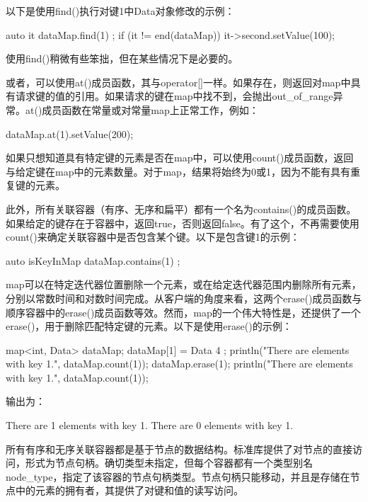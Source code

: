以下是使用find()执行对键1中Data对象修改的示例：

\begin{cpp}
auto it { dataMap.find(1) };
if (it != end(dataMap)) {
    it->second.setValue(100);
}
\end{cpp}

使用find()稍微有些笨拙，但在某些情况下是必要的。

或者，可以使用at()成员函数，其与operator[]一样。如果存在，则返回对map中具有请求键的值的引用。如果请求的键在map中找不到，会抛出out\_of\_range异常。at()成员函数在常量或对常量map上正常工作，例如：

\begin{cpp}
dataMap.at(1).setValue(200);
\end{cpp}

如果只想知道具有特定键的元素是否在map中，可以使用count()成员函数，返回与给定键在map中的元素数量。对于map，结果将始终为0或1，因为不能有具有重复键的元素。

此外，所有关联容器（有序、无序和扁平）都有一个名为contains()的成员函数。如果给定的键存在于容器中，返回true，否则返回false。有了这个，不再需要使用count()来确定关联容器中是否包含某个键。以下是包含键1的示例：

\begin{cpp}
auto isKeyInMap { dataMap.contains(1) };
\end{cpp}


map可以在特定迭代器位置删除一个元素，或在给定迭代器范围内删除所有元素，分别以常数时间和对数时间完成。从客户端的角度来看，这两个erase()成员函数与顺序容器中的erase()成员函数等效。然而，map的一个伟大特性是，还提供了一个erase()，用于删除匹配特定键的元素。以下是使用erase()的示例：

\begin{cpp}
map<int, Data> dataMap;
dataMap[1] = Data { 4 };
println("There are {} elements with key 1.", dataMap.count(1));
dataMap.erase(1);
println("There are {} elements with key 1.", dataMap.count(1));
\end{cpp}

输出为：

\begin{shell}
There are 1 elements with key 1.
There are 0 elements with key 1.
\end{shell}


所有有序和无序关联容器都是基于节点的数据结构。标准库提供了对节点的直接访问，形式为节点句柄。确切类型未指定，但每个容器都有一个类型别名node\_type，指定了该容器的节点句柄类型。节点句柄只能移动，并且是存储在节点中的元素的拥有者，其提供了对键和值的读写访问。

